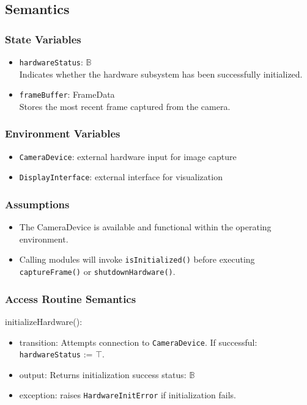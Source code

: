 \documentclass[12pt, titlepage]{article}
\begin{document}
\subsection{Semantics}

\subsubsection{State Variables}
\begin{itemize}
\item \texttt{hardwareStatus}: $\mathbb{B}$ \\
      Indicates whether the hardware subsystem has been successfully initialized.
\item \texttt{frameBuffer}: FrameData \\
      Stores the most recent frame captured from the camera.
\end{itemize}

\subsubsection{Environment Variables}
\begin{itemize}
\item \texttt{CameraDevice}: external hardware input for image capture
\item \texttt{DisplayInterface}: external interface for visualization
\end{itemize}

\subsubsection{Assumptions}
\begin{itemize}
  \item The CameraDevice is available and functional within the operating environment.
  \item Calling modules will invoke \texttt{isInitialized()} before executing 
        \texttt{captureFrame()} or \texttt{shutdownHardware()}.
\end{itemize}

\subsubsection{Access Routine Semantics}

\noindent initializeHardware():
\begin{itemize}
\item transition: Attempts connection to \texttt{CameraDevice}.  
      If successful: \texttt{hardwareStatus} := $\top$.
\item output: Returns initialization success status: $\mathbb{B}$
\item exception: raises \texttt{HardwareInitError} if initialization fails.
\end{itemize}
\end{document}
